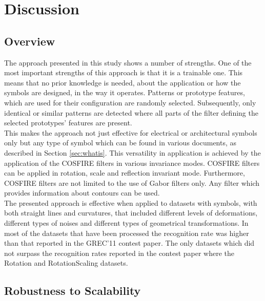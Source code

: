 \chapter{Discussion}
\label{chap:disc}

\section{Overview}
The approach presented in this study shows a number of strengths. One of the most important strengths of this approach is that it is a trainable one. This means that no prior knowledge is needed, about the application or how the symbols are designed, in the way it operates. Patterns or prototype features, which are used for their configuration are randomly selected. Subsequently, only identical or similar patterns are detected where all parts of the filter defining the selected prototypes' features are present. \\

This makes the approach not just effective for electrical or architectural symbols only but any type of symbol which can be found in various documents, as described in Section \ref{sec:whatis}. This versatility in application is achieved by the application of the COSFIRE filters in various invariance modes. COSFIRE filters can be applied in rotation, scale and reflection invariant mode. Furthermore, COSFIRE filters are not limited to the use of Gabor filters only. Any filter which provides information about contours can be used. \\

The presented approach is effective when applied to datasets with symbols, with both straight lines and curvatures, that included different levels of deformations, different types of noises and different types of geometrical transformations. In most of the datasets that have been processed the recognition rate was higher than that reported in the GREC'11 contest paper. The only datasets which did not surpass the recognition rates reported in the contest paper where the Rotation and RotationScaling datasets. 

\section{Robustness to Scalability}

